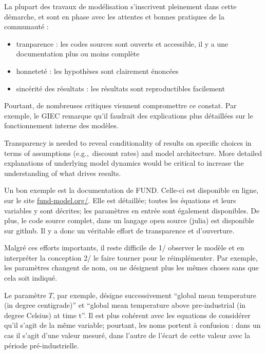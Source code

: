 La plupart des travaux de modélisation s'inscrivent pleinement dans cette démarche, et sont en phase avec les attentes et bonnes pratiques de la communauté : 

\begin{itemize}
    \item tranparence : les codes sources sont ouverts et accessible, il y a une documentation plus ou moins complète
    \item honneteté : les hypothèses sont clairement énoncées
    \item sincérité des résultats : les résultats sont reproductibles facilement
\end{itemize}

Pourtant, de nombreuses critiques viennent compromettre ce constat. Par exemple, le GIEC remarque qu'il faudrait des explications plus détaillées sur le fonctionnement interne des modèles. 


\begin{authoredquote}
Transparency is needed to reveal conditionality of results on specific choices in terms of assumptions (e.g., discount rates) and model architecture. More detailed explanations of underlying model dynamics would be critical to increase the understanding of what drives results.
\end{authoredquote}


Un bon exemple est la documentation de FUND. Celle-ci est disponible en ligne, sur le site \href{http://www.fund-model.org/}{fund-model.org/}. Elle est détaillée; toutes les équations et leurs variables y sont décrites; les paramètres en entrée sont également disponibles. De plus, le code source complet, dans un langage open source (julia) est disponible sur github. Il y a donc un véritable effort de transparence et d'ouverture. 

Malgré ces efforts importants, il reste difficile de 1/ observer le modèle et en interpréter la conception 2/ le faire tourner pour le réimplémenter.  Par exemple, les paramètres changent de nom, ou ne désignent plus les mêmes choses sans que cela soit indiqué.

Le paramètre $T$, par exemple, désigne successivement \enquote{global mean temperature (in degree centigrade)} et \enquote{global mean temperature above pre-industrial (in degree Celsius) at time t}. Il est plus cohérent avec les equations de considérer qu'il s'agit de la même variable; pourtant, les noms portent à confusion : dans un cas il s'agit d'une valeur mesuré, dans l'autre de l'écart de cette valeur avec la période pré-industrielle. 

